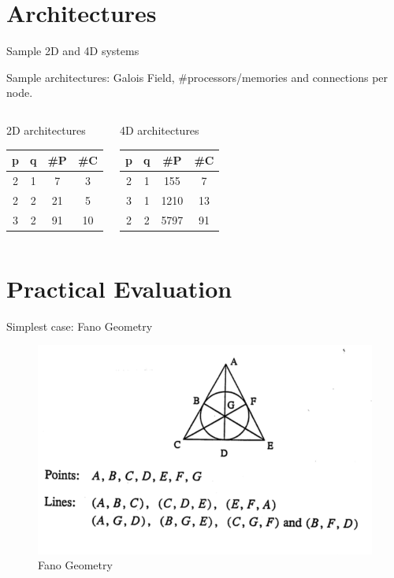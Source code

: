 \documentclass{beamer}
\begin{document}
\section{Architectures}

\begin{frame}{Sample 2D and 4D systems}

Sample architectures: Galois Field, #processors/memories and connections per node.

\begin{columns}
\begin{block}{2D architectures}

\begin{tabular}{c|c|c|c}
\textbf{p} & \textbf{q} & \textbf{\#P}& \textbf{\#C} \\
\hline
\hline
2 & 1 &7 &3  \\
\hline 
2 & 2 & 21 & 5\\
\hline
3 & 2 & 91 & 10 \\
\end{tabular}
\end{block}

\begin{block}{4D architectures}

\begin{tabular}{c|c|c|c}
\textbf{p} & \textbf{q} & \textbf{\#P}& \textbf{\#C} \\
\hline
\hline
 2 &1 &155&7  \\
\hline
3 & 1 & 1210 & 13 \\
\hline 
2 & 2 & 5797 & 91 \\
\end{tabular}
\end{block}
\end{columns}
\end{frame}




\section{Practical Evaluation}


\begin{frame}{Simplest case: Fano Geometry}
\begin{figure}
\includegraphics[scale=0.3]{Fano.png}
\caption{Fano Geometry}
\end{figure}
\end{frame}
\end{document}
